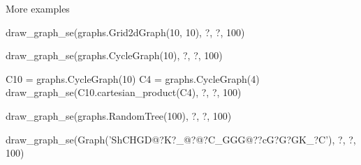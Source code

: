 More examples
\begin{sageCell}
    draw_graph_se(graphs.Grid2dGraph(10, 10), ?, ?, 100)

    draw_graph_se(graphs.CycleGraph(10), ?, ?, 100)

    C10 = graphs.CycleGraph(10)
    C4 = graphs.CycleGraph(4)
    draw_graph_se(C10.cartesian_product(C4), ?, ?, 100)

    draw_graph_se(graphs.RandomTree(100), ?, ?, 100)

    draw_graph_se(Graph('ShCHGD@?K?_@?@?C_GGG@??cG?G?GK_?C'), ?, ?, 100)
\end{sageCell}
